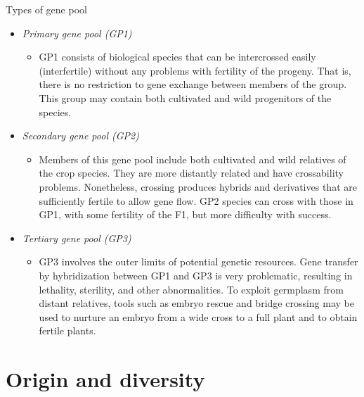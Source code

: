 \documentclass[ignorenonframetext,aspectratio=169]{beamer}
\providecommand{\tightlist}{%
  \setlength{\itemsep}{0pt}\setlength{\parskip}{0pt}}
\begin{document}
\begin{frame}{Types of gene pool}
\protect\hypertarget{types-of-gene-pool}{}

\begin{itemize}
\tightlist
\item
  \emph{Primary gene pool (GP1)}

  \begin{itemize}
  \tightlist
  \item
    GP1 consists of biological species that can be intercrossed easily
    (interfertile) without any problems with fertility of the progeny.
    That is, there is no restriction to gene exchange between members of
    the group. This group may contain both cultivated and wild
    progenitors of the species.
  \end{itemize}
\item
  \emph{Secondary gene pool (GP2)}

  \begin{itemize}
  \tightlist
  \item
    Members of this gene pool include both cultivated and wild relatives
    of the crop species. They are more distantly related and have
    crossability problems. Nonetheless, crossing produces hybrids and
    derivatives that are sufficiently fertile to allow gene flow. GP2
    species can cross with those in GP1, with some fertility of the F1,
    but more difficulty with success.
  \end{itemize}
\item
  \emph{Tertiary gene pool (GP3)}

  \begin{itemize}
  \tightlist
  \item
    GP3 involves the outer limits of potential genetic resources. Gene
    transfer by hybridization between GP1 and GP3 is very problematic,
    resulting in lethality, sterility, and other abnormalities. To
    exploit germplasm from distant relatives, tools such as embryo
    rescue and bridge crossing may be used to nurture an embryo from a
    wide cross to a full plant and to obtain fertile plants.
  \end{itemize}
\end{itemize}

\end{frame}

\hypertarget{origin-and-diversity}{%
\section{Origin and diversity}\label{origin-and-diversity}}
\end{document}
